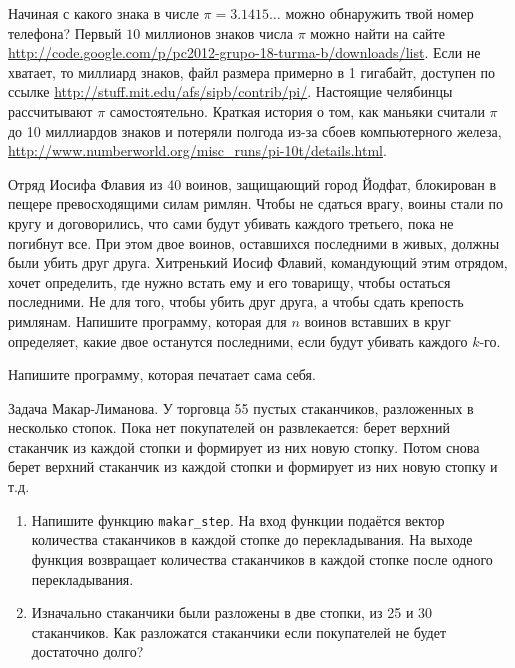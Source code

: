 \documentclass[pdftex,11pt,openany]{book}\usepackage[]{graphicx}\usepackage[]{color}
\begin{document}
\begin{problem}
Начиная с какого знака в числе $\pi=3.1415\ldots$ можно обнаружить твой номер телефона? Первый $10$ миллионов знаков числа $\pi$ можно найти на сайте \url{http://code.google.com/p/pc2012-grupo-18-turma-b/downloads/list}. Если не хватает, то миллиард знаков, файл размера примерно в 1 гигабайт, доступен по ссылке \url{http://stuff.mit.edu/afs/sipb/contrib/pi/}. Настоящие челябинцы рассчитывают $\pi$ самостоятельно. Краткая история о том, как маньяки считали $\pi$ до 10 миллиардов знаков и потеряли полгода из-за сбоев компьютерного железа, \url{http://www.numberworld.org/misc_runs/pi-10t/details.html}. 
\end{problem}

\begin{solution}
\end{solution}


\begin{problem}
Отряд Иосифа Флавия из 40 воинов, защищающий город Йодфат, блокирован в пещере превосходящими силам римлян. Чтобы не сдаться врагу, воины стали по кругу и договорились, что сами будут убивать каждого третьего, пока не погибнут все. При этом двое воинов, оставшихся последними в живых, должны были убить друг друга. Хитренький Иосиф Флавий, командующий этим отрядом, хочет определить, где нужно встать ему и его товарищу, чтобы остаться последними. Не для того, чтобы убить друг друга, а чтобы сдать крепость римлянам. Напишите программу, которая для $n$ воинов вставших в круг определяет, какие двое останутся последними, если будут убивать каждого $k$-го.
\end{problem}

\begin{solution}
\end{solution}


\begin{problem}
Напишите программу, которая печатает сама себя.
\end{problem}

\begin{solution}
\end{solution}

\begin{problem}
Задача Макар-Лиманова. У торговца 55 пустых стаканчиков, разложенных в несколько стопок. Пока нет покупателей он развлекается: берет верхний стаканчик из каждой стопки и формирует из них новую стопку. Потом снова берет верхний стаканчик из каждой стопки и формирует из них новую стопку и т.д.
\begin{enumerate}
\item Напишите функцию \verb|makar_step|. На вход функции подаётся вектор количества стаканчиков в каждой стопке до перекладывания. На выходе функция возвращает количества стаканчиков в каждой стопке после одного перекладывания.
\item Изначально стаканчики были разложены в две стопки, из 25 и 30 стаканчиков. Как разложатся стаканчики если покупателей не будет достаточно долго?
\end{enumerate}
\end{problem}
\end{document}
